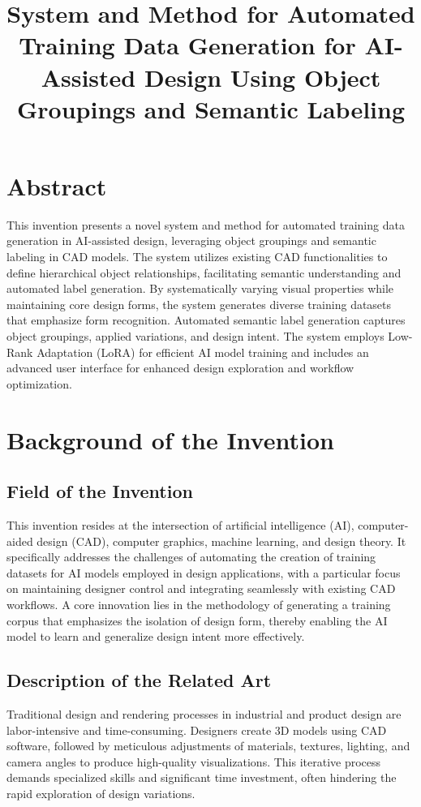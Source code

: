 \documentclass{article}
\title{System and Method for Automated Training Data Generation for AI-Assisted Design Using Object Groupings and Semantic Labeling}
\begin{document}
\section{Abstract}

This invention presents a novel system and method for automated training data generation in AI-assisted design, leveraging object groupings and semantic labeling in CAD models. The system utilizes existing CAD functionalities to define hierarchical object relationships, facilitating semantic understanding and automated label generation. By systematically varying visual properties while maintaining core design forms, the system generates diverse training datasets that emphasize form recognition. Automated semantic label generation captures object groupings, applied variations, and design intent. The system employs Low-Rank Adaptation (LoRA) for efficient AI model training and includes an advanced user interface for enhanced design exploration and workflow optimization.

\section{Background of the Invention}

\subsection{Field of the Invention}

This invention resides at the intersection of artificial intelligence (AI), computer-aided design (CAD), computer graphics, machine learning, and design theory. It specifically addresses the challenges of automating the creation of training datasets for AI models employed in design applications, with a particular focus on maintaining designer control and integrating seamlessly with existing CAD workflows. A core innovation lies in the methodology of generating a training corpus that emphasizes the isolation of design form, thereby enabling the AI model to learn and generalize design intent more effectively.

\subsection{Description of the Related Art}

Traditional design and rendering processes in industrial and product design are labor-intensive and time-consuming. Designers create 3D models using CAD software, followed by meticulous adjustments of materials, textures, lighting, and camera angles to produce high-quality visualizations. This iterative process demands specialized skills and significant time investment, often hindering the rapid exploration of design variations.
\end{document}
